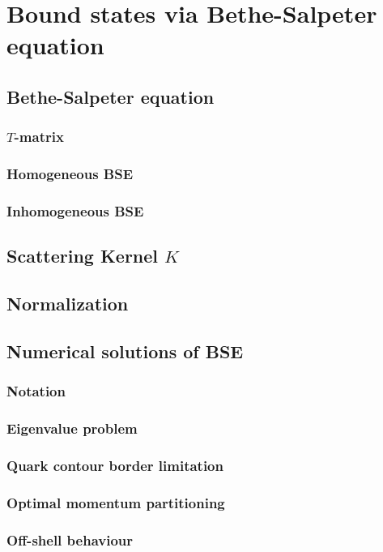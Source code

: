\chapter{Bound states via Bethe-Salpeter equation}
\label{chap:BSE}

\section{Bethe-Salpeter equation}
	\subsection*{$T$-matrix}
	\subsection*{Homogeneous BSE}
	\subsection*{Inhomogeneous BSE}
\section{Scattering Kernel $K$}
\section{Normalization}
\section{Numerical solutions of BSE}
	\subsection*{Notation}
	\subsection*{Eigenvalue problem}
	\subsection*{Quark contour border limitation}
	\subsection*{Optimal momentum partitioning}
	\subsection*{Off-shell behaviour}